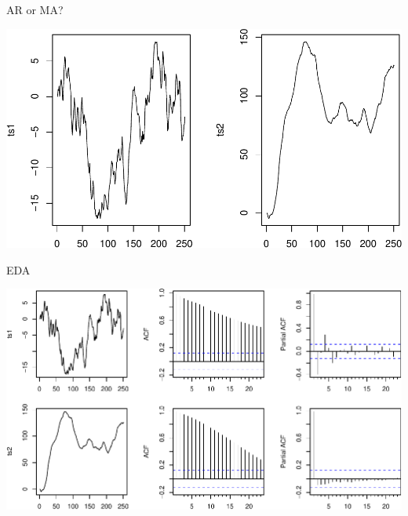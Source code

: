 \documentclass[11pt,ignorenonframetext,]{beamer}
\begin{document}
\begin{frame}{%
\protect\hypertarget{ar-or-ma}{%
AR or MA?}}

\begin{center}\includegraphics[width=\textwidth]{Lec09_files/figure-beamer/unnamed-chunk-9-1} \end{center}

\end{frame}

\begin{frame}{%
\protect\hypertarget{eda-1}{%
EDA}}

\begin{center}\includegraphics[width=\textwidth]{Lec09_files/figure-beamer/unnamed-chunk-10-1} \end{center}

\end{frame}
\end{document}
